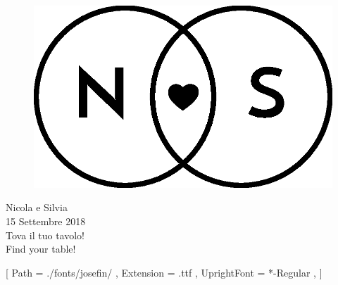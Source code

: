 \documentclass[20pt]{extarticle}
\begin{document}
\begin{figure}
\centering
\includegraphics[scale=1.3]{img/Logo_piccolo.eps}
\end{figure}
\begin{center}
\Huge Nicola e Silvia\\
\Large 15 Settembre 2018\\
\vfill
\vspace{30mm}
{\fontsize{100}{120}\selectfont Tova il tuo tavolo!\\}
\vspace{10mm}
{\fontsize{100}{120}\selectfont Find your table!}
\vspace{30mm}
\end{center}
\setmainfont{JosefinSans}[
Path = ./fonts/josefin/ ,
Extension = .ttf ,
UprightFont = *-Regular ,
]
\vfill
\begin{figure}[h!]
\centering
\large{}
\end{figure}
\vspace{20mm}
\end{document}
